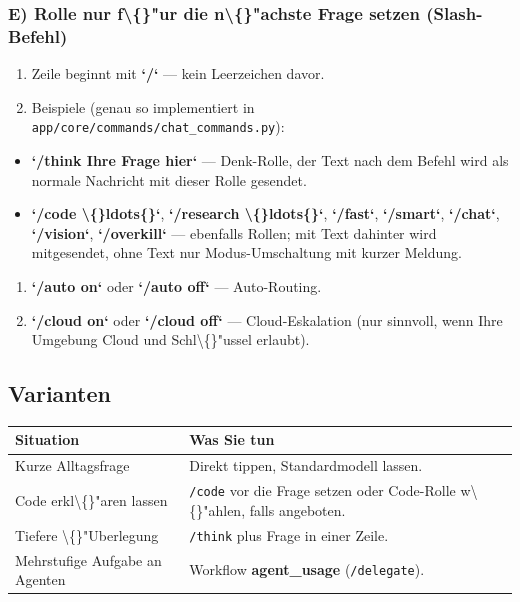\subsubsection{E) Rolle nur f\textbackslash\{\}"ur die n\textbackslash\{\}"achste Frage setzen (Slash-Befehl)}

\begin{enumerate}
\item Zeile beginnt mit \textbf{`/`} --- kein Leerzeichen davor.
\item Beispiele (genau so implementiert in \texttt{app/core/commands/chat\_commands.py}):
\end{enumerate}

\begin{itemize}
\item \textbf{`/think Ihre Frage hier`} --- Denk-Rolle, der Text nach dem Befehl wird als normale Nachricht mit dieser Rolle gesendet.
\item \textbf{`/code \textbackslash\{\}ldots\{\}`}, \textbf{`/research \textbackslash\{\}ldots\{\}`}, \textbf{`/fast`}, \textbf{`/smart`}, \textbf{`/chat`}, \textbf{`/vision`}, \textbf{`/overkill`} --- ebenfalls Rollen; mit Text dahinter wird mitgesendet, ohne Text nur Modus-Umschaltung mit kurzer Meldung.
\end{itemize}

\begin{enumerate}
\item \textbf{`/auto on`} oder \textbf{`/auto off`} --- Auto-Routing.
\item \textbf{`/cloud on`} oder \textbf{`/cloud off`} --- Cloud-Eskalation (nur sinnvoll, wenn Ihre Umgebung Cloud und Schl\textbackslash\{\}"ussel erlaubt).
\end{enumerate}

\subsection{Varianten}

\begin{center}
\begin{tabular}{ll}
\hline
Situation & Was Sie tun \\
\hline
Kurze Alltagsfrage & Direkt tippen, Standardmodell lassen. \\
Code erkl\textbackslash\{\}"aren lassen & \texttt{/code} vor die Frage setzen oder Code-Rolle w\textbackslash\{\}"ahlen, falls angeboten. \\
Tiefere \textbackslash\{\}"Uberlegung & \texttt{/think} plus Frage in einer Zeile. \\
Mehrstufige Aufgabe an Agenten & Workflow \textbf{agent\_usage} (\texttt{/delegate}). \\
\hline
\end{tabular}
\end{center}

